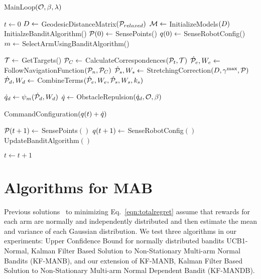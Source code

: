 \begin{algorithm}[h]
    \caption{MainLoop$(\mathcal{O}, \beta, \lambda)$}
    \begin{algorithmic}[1]
        \State $t \gets 0$
        \State $D \gets$ GeodesicDistanceMatrix$(\mathcal{P}_{relaxed})$
        \State $\mathcal{M} \gets$ InitializeModels$(D)$
        \State InitialzeBanditAlgorithm()
        \State $\mathcal{P}(0) \gets$ SensePoints()
        \State $q(0) \gets$ SenseRobotConfig()
            \State $m \gets $ SelectArmUsingBanditAlgorithm()
            
            \State $\mathcal{T} \gets$ GetTargets()
            \State $\mathcal{P}_C \gets$ CalculateCorrespondences$(\mathcal{P}_t, \mathcal{T})$
            \State $\dot{\mathcal{P}}_e, W_e \gets$ FollowNavigationFunction$(\mathcal{P}_n, \mathcal{P}_C)$
            \State $\dot{\mathcal{P}}_s, W_s \gets$ StretchingCorrection$(D, \gamma^{\textrm{max}}, \mathcal{P})$
            \State $\dot{\mathcal{P}}_d, W_d \gets$ CombineTerms$(\dot{\mathcal{P}}_e, W_e, \dot{\mathcal{P}}_s, W_s, k_s)$

            \State $\dot{q}_d \gets \psi_m(\dot{\mathcal{P}}_d, W_d)$
            \State $\dot{q} \gets$ ObstacleRepulsion$(\dot{q}_d, \mathcal{O}, \beta)$
            
            \State CommandConfiguration$(q(t) + \dot{q})$

            \State $\mathcal{P}(t + 1) \gets$ SensePoints$()$
            \State $q(t + 1) \gets$ SenseRobotConfig$()$
            \State UpdateBanditAlgorithm$()$
            
            \State $t \gets t + 1$
        \EndWhile
    \end{algorithmic}
    \label{alg:mab_mainloop}
\end{algorithm}


\section{Algorithms for MAB}
\label{sec:bandit_algorithms}

Previous solutions~\cite{Auer2002,Granmo2010} to minimizing Eq.~\eqref{eqn:totalregret} assume that rewards for each arm are normally and independently distributed and then estimate the mean and variance of each Gaussian distribution.  We test three algorithms in our experiments: Upper Confidence Bound for normally distributed bandits UCB1-Normal, Kalman Filter Based Solution to Non-Stationary Multi-arm Normal Bandits (KF-MANB), and our extension of KF-MANB, Kalman Filter Based Solution to Non-Stationary Multi-arm Normal Dependent Bandit (KF-MANDB).

